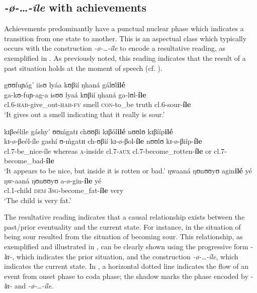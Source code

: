 \documentclass[output=paper,newtxmath,modfonts,nonflat,draftmode]{langsci/langscibook}
\begin{document}
\subsection{\textit{-ø-\ldots-íle} with achievements}

Achievements predominantly have a punctual nuclear phase which indicates a transition from one state to another. This is an aspectual class which typically occurs with the construction \textit{-ø-…-íle} to encode a resultative reading, as exemplified in . As previously noted, this reading indicates that the result of a past situation holds at the moment of speech (cf. \citealt{Comrie1976,Bybee1994}).

\ea \label{ex:kanijo:15}
\ea \glll gʊʊfuɲág’ iisʊ   lyáa kʊβií ŋhaná {gálʊl\textbf{ilé}}\\
    ga-kʊ-fuɲ-ag-a isʊʊ  lyaá kʊβií ŋhaná   {ga-lʊl-\textbf{íle}}\\
    cl.6-\textsc{hab}-give\_out-\textsc{hab}-\textsc{fv} smell \textsc{con}-to\_be truth   {cl.6-sour-\textbf{íle}}\\
    \glt ‘It gives out a smell indicating that it really is sour.’

\ex 
    \glll   kɪβeélile       gáshy’      ʊʊḿgatɪ         chʊʊβi      kɪβól\textbf{ilé}  nʊʊlʊ kɪβííp\textbf{ilé}\\ 
            kɪ-ø-βeél-íle    gashí      ʊ-\`{m}gatɪɪ    ch-ʊβií     kɪ-ø-βol-\textbf{íle} nʊʊlʊ kɪ-ø-βiíp-\textbf{íle}\\       
            cl.7-be\_nice-íle  whereas   \textsc{a}-inside        cl.7-\textsc{aux}    cl.7-become\_rotten-\textbf{íle} or     cl.7-become\_bad-\textbf{íle}\\
    \glt ‘It appears to be nice, but inside it is rotten or bad.’
\ex 
    \glll   ŋwaaná   ŋʊnʊʊyʊ    agin\textbf{ilé}  yé\\
            ŋw-aaná   ŋʊnʊʊyʊ   a-ø-gin-\textbf{íle}    yé\\
            cl.1-child \textsc{dem}         3\textsc{sg}-become\_fat-\textbf{íle} very\\
    \glt ‘The child is very fat.’
\z
\z

The resultative reading indicates that a causal relationship exists between the past/prior eventuality and the current state. For instance, in  the situation of being sour resulted from the situation of becoming sour. This relationship, as exemplified and illustrated in , can be clearly shown using the progressive form -\textit{lɪɪ-}, which indicates the prior situation, and the construction \textit{-ø-\ldots-íle}, which indicates the current state. In , a horizontal dotted line indicates the flow of an event from onset phase to coda phase; the shadow marks the phase encoded by -\textit{lɪɪ-} and \textit{-ø-\ldots-íle}. 
\end{document}
